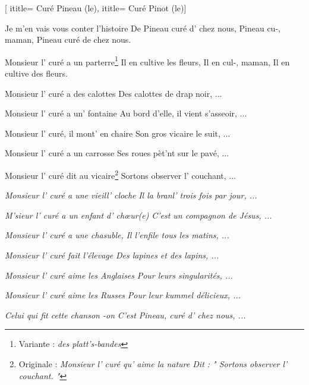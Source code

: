  [
ititle= {Curé Pineau (le)},
ititle= {Curé Pinot (le)}]


\beginverse
Je m'en vais vous conter l'histoire
De Pineau curé d' chez nous,
 {Pineau cu-, maman,} {Pineau curé de chez nous.}
\endverse

\beginverse
Monsieur l' curé a un parterre\footnote { Variante : \emph{des platt's-bandes}}
Il en cultive les fleurs,
 {Il en cul-, maman,} {Il en cultive des fleurs.}
\endverse

\beginverse
Monsieur l' curé a des calottes
Des calottes de drap noir, ...
\endverse

\beginverse
Monsieur l' curé a un' fontaine
Au bord d'elle, il vient s'asseoir, ...
\endverse

\beginverse
Monsieur l' curé, il mont' en chaire
Son gros vicaire le suit, ...
\endverse

\beginverse
Monsieur l' curé a un carrosse
Ses roues pèt'nt sur le pavé, ...
\endverse

\beginverse
Monsieur l' curé dit au vicaire\footnote {Originale : \emph{Monsieur l' curé qu' aime la nature Dit : " Sortons observer l' couchant. "}}
Sortons observer l' couchant, ...
\endverse

\beginverse
\textit{Monsieur l' curé a une vieill' cloche}
\textit{Il la branl' trois fois par jour, ...}
\endverse

\beginverse
\textit{M'sieur l' curé a un enfant d' chœur(e)}
\textit{C'est un compagnon de Jésus, ...}
\endverse

\beginverse
\textit{Monsieur l' curé a une chasuble,}
\textit{Il l'enfile tous les matins, ...}
\endverse

\beginverse
\textit{Monsieur l' curé fait l'élevage}
\textit{Des lapines et des lapins, ...}
\endverse

\beginverse
\textit{Monsieur l' curé aime les Anglaises}
\textit{Pour leurs singularités, ...}
\endverse

\beginverse
\textit{Monsieur l' curé aime les Russes}
\textit{Pour leur kummel délicieux, ...}
\endverse

\beginverse
\textit{Celui qui fit cette chanson -on}
\textit{C'est Pineau, curé d' chez nous, ...}
\endverse

\endsong
